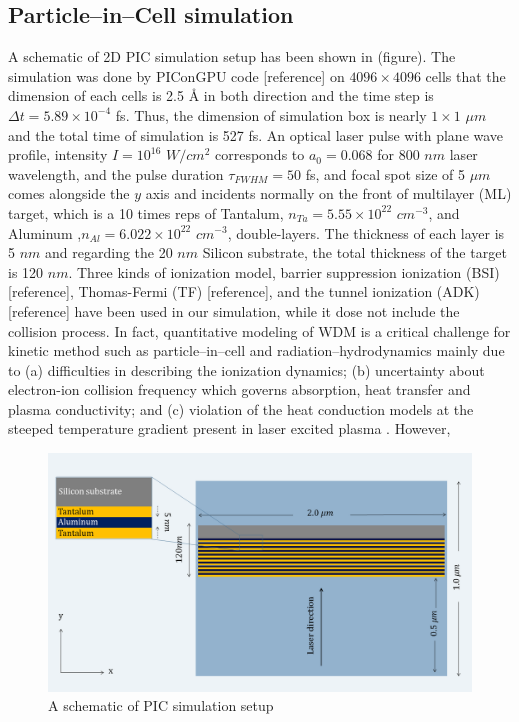 \documentclass[preprint, 12pt]{elsarticle}
\begin{document}
\subsection{Particle--in--Cell simulation}
A schematic of 2D PIC simulation setup has been shown in (figure). The
simulation was done by PIConGPU code [reference] on $4096 \times 4096$ cells
that the dimension of each cells is 2.5 {\AA} in both direction and the time
step is ${\Delta}t=5.89 \times 10^{-4}$ fs. Thus, the dimension of simulation
box is nearly $1 \times 1$ $\mu m$ and the total time of simulation is 527 fs.
An optical laser pulse with plane wave profile, intensity $I = 10^{16}$
$W/{cm}^2$ corresponds to $a_{0} = 0.068$ for 800 $nm$ laser wavelength, and the
pulse duration $\tau_{FWHM}=50$ fs, and focal spot size of 5 $\mu m$  comes
alongside the $y$ axis and incidents normally on the front of multilayer (ML)
target, which is a 10 times reps of Tantalum, $n_{Ta} = 5.55 \times 10^{22}$
$cm^{-3}$, and Aluminum ,$n_{Al} = 6.022 \times 10^{22}$ $cm^{-3}$,
double-layers. The thickness of each layer is 5 $nm$ and regarding the 20 $nm$
Silicon substrate, the total thickness of the target is 120 $nm$. Three kinds of
ionization model, barrier suppression ionization (BSI) [reference], Thomas-Fermi
(TF) [reference], and the tunnel ionization (ADK) [reference] have been used in
our simulation, while it dose not include the collision process. In fact,
quantitative modeling of WDM is a critical challenge for kinetic method such as
particle--in--cell and radiation--hydrodynamics mainly due to (a) difficulties
in describing the ionization dynamics; (b) uncertainty about electron-ion
collision frequency which governs absorption, heat transfer and plasma
conductivity; and (c) violation of the heat conduction models at the steeped
temperature gradient present in laser excited plasma \cite{TBC}. However,

\begin{figure}[h]
\centering\includegraphics[width=0.8\linewidth]{P_2.png}
\caption{A schematic of PIC simulation setup}
\end{figure}
\end{document}
